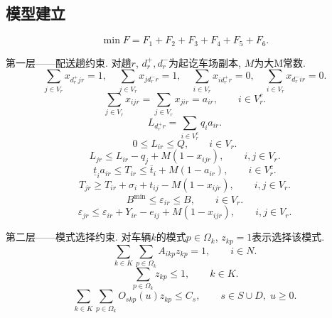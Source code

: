 \documentclass{setp-new}
\begin{document}
\subsection{模型建立}

\begin{equation}
\min F=F_1+F_2+F_3+F_4+F_5+F_6. \label{eq:obj}
\end{equation}

第一层——配送趟约束.
对趟$r$, $d_r^+,d_r^-$为起讫车场副本, $M$为大M常数.
\begin{equation}
\sum_{j\in V_r}x_{d_r^+jr}=1,\quad\sum_{j\in V_r}x_{jd_r^-r}=1,\quad
\sum_{i\in V_r}x_{id_r^+r}=0,\quad\sum_{i\in V_r}x_{d_r^-ir}=0.
\label{eq:trip_flow}
\end{equation}
\begin{equation}
\sum_{j\in V_r}x_{ijr}=\sum_{j\in V_r}x_{jir}=a_{ir},\qquad i\in V_r^c.
\label{eq:flow_cons}
\end{equation}
\begin{equation}
L_{d_r^+r}=\sum_{i\in V_r^c}q_i a_{ir}.
\label{eq:load_init}
\end{equation}
\begin{equation}
0\le L_{ir}\le Q,\qquad i\in V_r.
\label{eq:load_bounds}
\end{equation}
\begin{equation}
L_{jr}\le L_{ir}-q_j+M(1-x_{ijr}),\qquad i,j\in V_r.
\label{eq:load_prop}
\end{equation}
\begin{equation}
\underline t_i a_{ir}\le T_{ir}\le\overline t_i+M(1-a_{ir}),\qquad i\in V_r^c.
\label{eq:tw}
\end{equation}
\begin{equation}
T_{jr}\ge T_{ir}+\sigma_i+t_{ij}-M(1-x_{ijr}),\qquad i,j\in V_r.
\label{eq:time_prop}
\end{equation}
\begin{equation}
B^{\min}\le\varepsilon_{ir}\le B,\qquad i\in V_r.
\label{eq:batt_bounds}
\end{equation}
\begin{equation}
\varepsilon_{jr}\le\varepsilon_{ir}+Y_{ir}-e_{ij}+M(1-x_{ijr}),\qquad i,j\in V_r.
\label{eq:batt_prop}
\end{equation}

第二层——模式选择约束.
对车辆$k$的模式$p\in\Omega_k$, $z_{kp}=1$表示选择该模式.
\begin{equation}
\sum_{k\in K}\sum_{p\in\Omega_k}A_{ikp}z_{kp}=1,\qquad i\in N.
\label{eq:coverage}
\end{equation}
\begin{equation}
\sum_{p\in\Omega_k}z_{kp}\le1,\qquad k\in K.
\label{eq:one_pattern}
\end{equation}
\begin{equation}
\sum_{k\in K}\sum_{p\in\Omega_k}O_{skp}(u)z_{kp}\le C_s,\qquad s\in S\cup D,\;u\ge0.
\label{eq:station_cap}
\end{equation}
\end{document}
